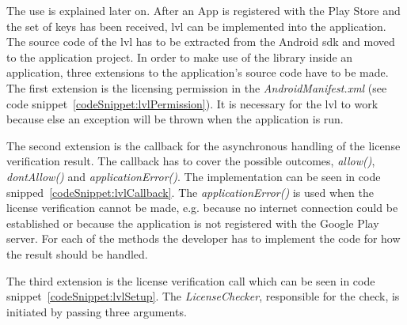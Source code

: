The use is explained later on. \cite{developersLicensingSetup}
\newline
After an App is registered with the Play Store and the set of keys has been received, \gls{lvl} can be implemented into the application.
The source code of the \gls{lvl} has to be extracted from the Android \gls{sdk} and moved to the application project.
In order to make use of the library inside an application, three extensions to the application's source code have to be made.
 \cite{digipomLvl} \cite{developersLicensingOverview}
\newline
The first extension is the licensing permission in the \textit{AndroidManifest.xml} (see code snippet~\ref{codeSnippet:lvlPermission}).
It is necessary for the \gls{lvl} to work because else an exception will be thrown when the application is run. \cite{developersLicensingSetup} \cite{developersLicensingAdding}
\newline

The second extension is the callback for the asynchronous handling of the license verification result.
The callback has to cover the possible outcomes, \textit{allow()}, \textit{dontAllow()} and \textit{applicationError()}.
The implementation can be seen in code snipped~\ref{codeSnippet:lvlCallback}.
The \textit{applicationError()} is used when the license verification cannot be made, e.g. because no internet connection could be established or because the application is not registered with the Google Play server.
For each of the methods the developer has to implement the code for how the result should be handled. \cite{developersLicensingOverview} \cite{developersLicensingSetup} \cite{developersLicensingAdding} \cite{digipomLvl}
\newline

The third extension is the license verification call which can be seen in code snippet~\ref{codeSnippet:lvlSetup}.
The \textit{LicenseChecker}, responsible for the check, is initiated by passing three arguments.
